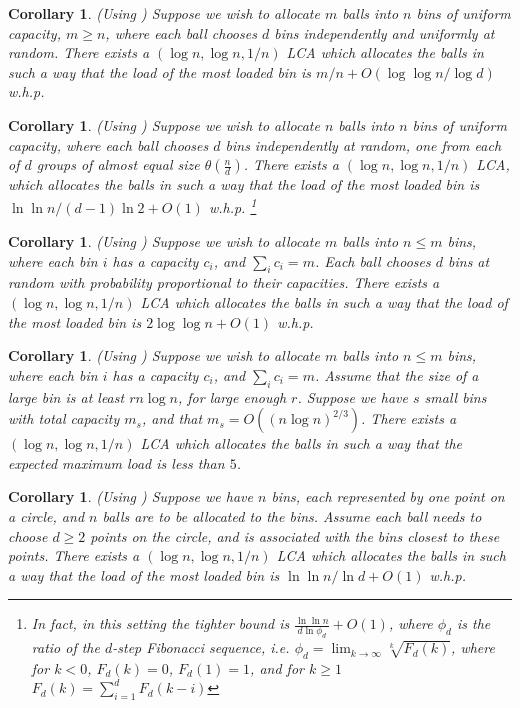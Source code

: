 \documentclass[english, oribibl]{llncs}
\newtheorem{corollary}[theorem]{Corollary}
\begin{document}
\begin{corollary}  (Using \cite{BCS+06}) 
Suppose we wish to allocate $m$ balls into $n$ bins of uniform capacity, $m \geq n$, where each ball chooses $d$ bins independently and uniformly at random. There exists 
a $(\log{n}, \log{n}, 1/n)$ LCA which allocates the balls in such a way that the load of the most loaded bin is $m/n + O(\log\log{n}/ \log{d})$ w.h.p.
\end{corollary}

\begin{corollary} (Using  \cite{Voc03}) 
Suppose we wish to allocate $n$ balls into $n$ bins of uniform capacity, where each ball chooses $d$ bins independently at random, one from each of $d$ groups of almost equal size $\theta (\frac{n}{d})$. There exists 
a $(\log{n}, \log{n}, 1/n)$ LCA, which allocates the balls in such a way that the load of the most loaded bin is $\ln\ln{n} / (d-1)\ln{2} +O(1)$ w.h.p.
\footnote{In fact, in this setting the tighter bound is
$\frac{\ln\ln{n}} {d\ln{\phi_d}} +O(1)$, where $\phi_d$ is the ratio of the $d$-step Fibonacci sequence, i.e. 
$\phi_d = \lim_{k \rightarrow \infty} \sqrt[k]{F_d(k)}$, 
where for $k < 0 $, $F_d(k) = 0$, $F_d(1) = 1$, and for $k\geq 1$ $F_d(k)=\sum_{i=1}^d{F_d(k-i)}$ }
\end{corollary}

\begin{corollary} (Using  \cite{BBFN10}) 
Suppose we wish to allocate $m$ balls into $n \leq m$ bins, where each bin $i$ has a capacity $c_i$, and $\sum_i c_i = m$. Each ball chooses $d$ bins at random with probability proportional to their capacities. There exists a  $(\log{n}, \log{n}, 1/n)$ LCA which allocates the balls in such a way that the load of the most loaded bin is $2 \log\log{n}+O(1)$ w.h.p.
\end{corollary}

\begin{corollary} (Using  \cite{BBFN10}) 
Suppose we wish to allocate $m$ balls into $n \leq m$ bins, where each bin $i$ has a capacity $c_i$, and $\sum_i c_i = m$. Assume that the size of a large bin is at least $rn \log{n}$, for large enough $r$. Suppose we have $s$ small bins with total capacity $m_s$, and that $m_s = O((n \log{n})^{2/3})$. There exists a  $(\log{n}, \log{n}, 1/n)$ LCA which allocates the balls in such a way that the expected maximum load is less than $5$.
\end{corollary}

\begin{corollary} (Using  \cite{BCM03}) 
Suppose we have $n$ bins, each represented by one point on a circle, and $n$ balls are to be allocated to the bins. Assume each ball needs to choose $d\geq2$ points on the circle, and is associated with the bins closest to these points. There exists a  $(\log{n}, \log{n}, 1/n)$ LCA which allocates the balls in such a way that the load of the most loaded bin is $\ln\ln{n}/ \ln{d} + O(1)$ w.h.p.
\end{corollary}
\end{document}
